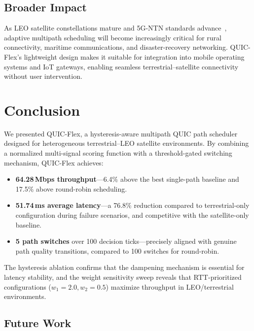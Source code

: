 \documentclass[conference,10pt]{IEEEtran}
\begin{document}
\subsection{Broader Impact}

As LEO satellite constellations mature and 5G-NTN standards advance~\cite{ahmed2026ntn5g}, adaptive multipath scheduling will become increasingly critical for rural connectivity, maritime communications, and disaster-recovery networking.
QUIC-Flex's lightweight design makes it suitable for integration into mobile operating systems and IoT gateways, enabling seamless terrestrial--satellite connectivity without user intervention.

\section{Conclusion}
\label{sec:conclusion}

We presented QUIC-Flex, a hysteresis-aware multipath QUIC path scheduler designed for heterogeneous terrestrial--LEO satellite environments.
By combining a normalized multi-signal scoring function with a threshold-gated switching mechanism, QUIC-Flex achieves:

\begin{itemize}
    \item \textbf{64.28\,Mbps throughput}—6.4\% above the best single-path baseline and 17.5\% above round-robin scheduling.
    \item \textbf{51.74\,ms average latency}—a 76.8\% reduction compared to terrestrial-only configuration during failure scenarios, and competitive with the satellite-only baseline.
    \item \textbf{5 path switches} over 100 decision ticks—precisely aligned with genuine path quality transitions, compared to 100 switches for round-robin.
\end{itemize}

The hysteresis ablation confirms that the dampening mechanism is essential for latency stability, and the weight sensitivity sweep reveals that RTT-prioritized configurations ($w_1 = 2.0, w_2 = 0.5$) maximize throughput in LEO/terrestrial environments.

\subsection{Future Work}
\end{document}
